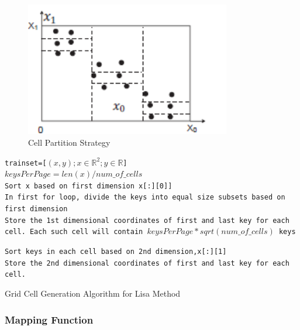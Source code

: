 \begin{figure}[t]
    \centering
    \includegraphics[width=0.8\textwidth]{graphs/Cell_partition.png}
    \caption{Cell Partition Strategy }
    \label{fig:Cell_Parttion}
\end{figure}


\begin{algorithm}[H]
    \SetAlgoLined
     \texttt{trainset=[$(x,y);x \in \mathbb{R}^{2};y \in \mathbb{R}$]} \\
     \texttt{$keysPerPage =  len(x) / num\_of\_cells $}\\
     \texttt{Sort x based on first dimension x[:][0]]}\\
     \texttt{In first for loop, divide the keys into equal size subsets based on first dimension }\\
     {
        \texttt{Store the 1st dimensional coordinates of first and last key for each cell. Each such cell will contain $keysPerPage*sqrt(num\_of\_cells)$ keys } \\
     }
     
     \texttt{Sort keys in each cell based on 2nd dimension,x[:][1] }\\
     
      {
         {
            \texttt{Store the 2nd dimensional coordinates of first and last key for each cell.} \\
		 }
      }
     \caption{Grid Cell Generation Algorithm for Lisa Method}
     \label{Training_Lisa_Baseline}
\end{algorithm}

\subsubsection{Mapping Function}

